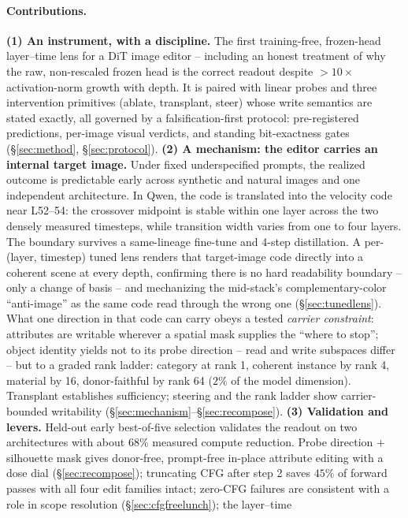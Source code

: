 \documentclass[10pt,twocolumn,letterpaper]{article}
\begin{document}
\paragraph{Contributions.} \textbf{(1) An instrument, with a discipline.} The first
training-free, frozen-head layer--time lens for a DiT image editor --
including an honest treatment of why the raw, non-rescaled frozen head
is the correct readout despite $>$$10\times$ activation-norm growth
with depth. It is paired with linear probes and three intervention
primitives (ablate, transplant, steer) whose write semantics are stated
exactly, all governed by a falsification-first protocol: pre-registered
predictions, per-image visual verdicts, and standing bit-exactness
gates (\S\ref{sec:method}, \S\ref{sec:protocol}). \textbf{(2) A
mechanism: the editor carries an internal target image.} Under fixed
underspecified prompts, the realized outcome is predictable early across
synthetic and natural images and one independent architecture. In Qwen,
the code is translated into
the velocity code near L52--54: the crossover midpoint is stable within
one layer across the two densely measured timesteps, while transition
width varies from one to four layers. The boundary survives a same-lineage
fine-tune and 4-step distillation. A per-(layer, timestep) tuned lens
renders that target-image code directly into a coherent scene at every
depth, confirming there is no hard readability boundary -- only a
change of basis -- and mechanizing the mid-stack's complementary-color
``anti-image'' as the same code read through the wrong one
(\S\ref{sec:tunedlens}). What one direction in that code can
carry obeys a tested \emph{carrier constraint}: attributes are writable wherever a
spatial mask supplies the ``where to stop''; object identity yields
not to its probe direction -- read and write subspaces differ -- but to
a graded rank ladder: category at rank 1, coherent instance by rank 4,
material by 16, donor-faithful by rank 64 ($2\%$ of the model
dimension). Transplant establishes sufficiency; steering and the rank
ladder show carrier-bounded writability
(\S\ref{sec:mechanism}--\S\ref{sec:recompose}). \textbf{(3) Validation and levers.}
Held-out early best-of-five selection validates the readout on two architectures with
about 68\% measured compute reduction. Probe direction $+$ silhouette mask gives
donor-free, prompt-free in-place attribute editing with a dose dial
(\S\ref{sec:recompose}); truncating CFG after step 2 saves $45\%$ of
forward passes with all four edit families intact; zero-CFG failures are
consistent with a role in scope resolution (\S\ref{sec:cfgfreelunch}); the layer--time
$$
\end{document}

